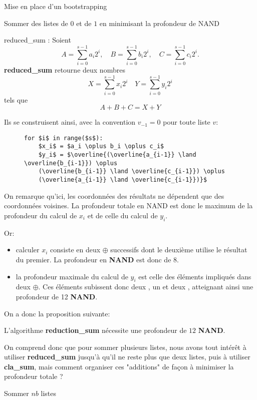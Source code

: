 \begin{section}{Mise en place d'un bootstrapping}
\begin{subsection}{Sommer des listes de $0$ et de $1$ en minimisant la profondeur de NAND}
\begin{subsubsection}{reduced\_sum :}
	Soient
\[A = \sum_{i=0}^{s-1} a_i 2^i, \quad B = \sum_{i=0}^{s-1} b_i 2^i, \quad C = \sum_{i=0}^{s-1} c_i 2^i. \]
\textbf{reduced\_sum} retourne deux nombres 
\[X = \sum_{i=0}^{s-1} x_i 2^i \quad Y = \sum_{i=0}^{s-1} y_i 2^i \] 
tels que 
\[A + B + C = X + Y\]

Ils se construisent ainsi, avec la convention $v_{-1} = 0 $ pour toute liste $v$:
\begin{figure}[!h]
\begin{lstlisting}
for $i$ in range($s$):
	$x_i$ = $a_i \oplus b_i \oplus c_i$
	$y_i$ = $\overline{(\overline{a_{i-1}} \land \overline{b_{i-1}}) \oplus
	(\overline{b_{i-1}} \land \overline{c_{i-1}}) \oplus
	(\overline{a_{i-1}} \land \overline{c_{i-1}})}$
\end{lstlisting}
\end{figure}

	On remarque qu'ici, les coordonnées des résultats ne dépendent que des coordonnées voisines. La profondeur
	totale en NAND est donc le maximum de la profondeur du calcul de $x_i$ et de celle du calcul de $y_i$.

Or:
\begin{itemize}
\item calculer $x_i$ consiste en deux $\oplus$ successifs dont le deuxième utilise le résultat du premier. La profondeur
en \textbf{NAND} est donc de 8. 
\item la profondeur maximale du calcul de $y_i$ est celle des éléments impliqués dans deux \nolinebreak
$\oplus$. Ces éléments subissent donc deux , un  et deux , atteignant ainsi une profondeur
de 12 \textbf{NAND}.
\end{itemize}

On a donc la proposition suivante:
\begin{prop}
\label{reduction_sum}
	L'algorithme \textbf{reduction\_sum} nécessite une profondeur de $12$ \textbf{NAND}.
\end{prop}

On comprend donc que pour sommer plusieurs listes, nous avons tout
intérêt à utiliser \textbf{reduced\_sum} jusqu'à qu'il ne reste plus
que deux listes, puis à utiliser \textbf{cla\_sum}, mais comment organiser ces "additions" de façon à minimiser la profondeur totale ?

\end{subsubsection}
\begin{subsubsection}{Sommer $nb$ listes}
\label{sec:sum_lists}

\end{subsubsection}
\end{subsection}
\end{section}
